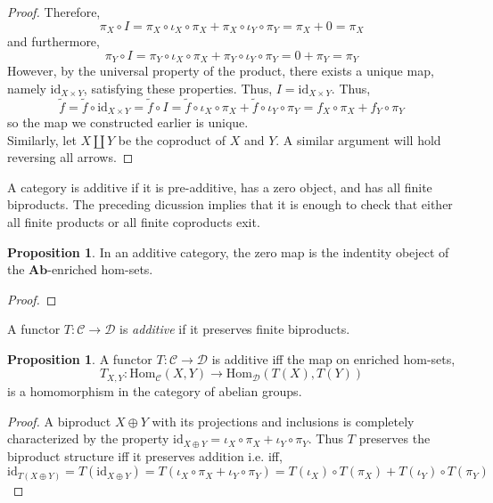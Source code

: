 \documentclass[12pt]{article}
\newcommand{\id}{\mathrm{id}}
\newcommand{\Homover}[3]{\mathrm{Hom}_{#1} \left( #2, #3 \right)}
\newcommand{\Ab}{\mathbf{Ab}}
\newcommand{\C}{\mathcal{C}}
\newcommand{\D}{\mathcal{D}}
\theoremstyle{remark}
\theoremstyle{definition}
\newtheorem{proposition}[theorem]{Proposition}
\newenvironment{definition}[1][Definition:]{\begin{trivlist}
\item[\hskip \labelsep {\bfseries #1}]}{\end{trivlist}}
\begin{document}
\begin{proof}
Therefore, 
\[ \pi_X \circ I = \pi_X \circ \iota_X \circ \pi_X + \pi_X \circ \iota_Y \circ \pi_Y = \pi_X + 0 = \pi_X \]
and furthermore,
\[ \pi_Y \circ I = \pi_Y \circ \iota_X \circ \pi_X + \pi_Y \circ \iota_Y \circ \pi_Y = 0 + \pi_Y = \pi_Y \]
However, by the universal property of the product, there exists a unique map, namely $\id_{X \times Y}$, satisfying these properties. Thus, $I = \id_{X \times Y}$. Thus,
\[ \tilde{f} = \tilde{f} \circ \id_{X \times Y} = \tilde{f} \circ I = \tilde{f} \circ \iota_X \circ \pi_X + \tilde{f} \circ \iota_Y \circ \pi_Y  = f_X \circ \pi_X + f_Y \circ \pi_Y \]
so the map we constructed earlier is unique. 
\bigskip\\
Similarly, let $X \coprod Y$ be the coproduct of $X$ and $Y$. A similar argument will hold reversing all arrows. 
\end{proof}


\begin{definition}
A category is additive if it is pre-additive, has a zero object, and has all finite biproducts. The preceding dicussion implies that it is enough to check that either all finite products or all finite coproducts exit.  
\end{definition}

\begin{proposition}
In an additive category, the zero map is the indentity obeject of the $\Ab$-enriched hom-sets.
\end{proposition}

\begin{proof}

\end{proof}

\begin{definition}
A functor $T : \C \to \D$ is \textit{additive} if it preserves finite biproducts.  
\end{definition}

\begin{proposition}
A functor $T : \C \to \D$ is additive iff the map on enriched hom-sets,
\[ T_{X,Y} : \Homover{\C}{X}{Y} \to \Homover{\D}{T(X)}{T(Y)} \]
is a homomorphism in the category of abelian groups.
\end{proposition}

\begin{proof}
A biproduct $X \oplus Y$ with its projections and inclusions is completely characterized by the property $\id_{X \oplus Y} = \iota_X \circ \pi_X + \iota_Y \circ \pi_Y$. Thus $T$ preserves the biproduct structure iff it preserves addition i.e. iff,
\[ \id_{T(X \oplus Y)} = T(\id_{X \oplus Y}) = T(\iota_X \circ \pi_X + \iota_Y \circ \pi_Y) = T(\iota_X) \circ T(\pi_X) + T(\iota_Y) \circ T(\pi_Y) \]
\end{proof}
\end{document}

